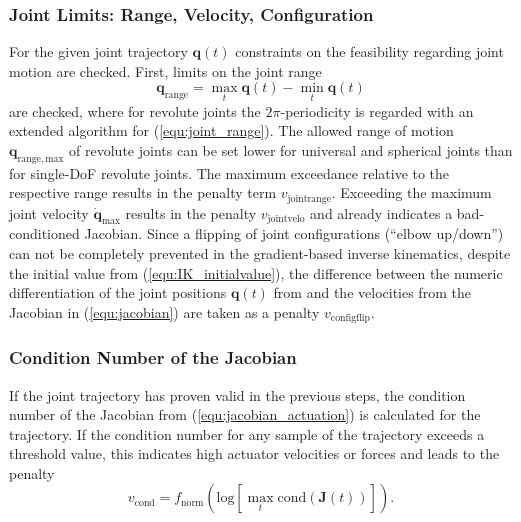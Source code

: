 \documentclass[fleqn,a4paper,10pt]{article}
\newcommand{\bm}[1]{\mathbf{#1}}
\begin{document}
\begin{multicols}{2}
\subsubsection{Joint Limits: Range, Velocity, Configuration}

For the given joint trajectory $\bm{q}(t)$ constraints on the feasibility regarding joint motion are checked.
First, limits on the joint range %
%
\begin{equation}
\bm{q}_\mathrm{range} = \max\limits_{t} \bm{q}(t) - \min\limits_{t} \bm{q}(t)
\label{equ:joint_range}
\end{equation}
%
are checked, where for revolute joints the $2\pi$-periodicity is regarded with an extended algorithm for (\ref{equ:joint_range}).
The allowed range of motion $\bm{q}_\mathrm{range,max}$ of revolute joints can be set lower for universal and spherical joints than for single-DoF revolute joints.
The maximum exceedance relative to the respective range results in the penalty term $v_\mathrm{jointrange}$.
%
Exceeding the maximum joint velocity $\dot{\bm{q}}_\mathrm{max}$ results in the penalty $v_\mathrm{jointvelo}$ and already indicates a bad-conditioned Jacobian.
%
Since a flipping of joint configurations (``elbow up/down'') can not be completely prevented in the gradient-based inverse kinematics, despite the initial value from (\ref{equ:IK_initialvalue}), the difference between the numeric differentiation of the joint positions $\bm{q}(t)$ from  and the velocities from the Jacobian in (\ref{equ:jacobian}) are taken as a penalty $v_\mathrm{configflip}$.


\subsubsection{Condition Number of the Jacobian}

If the joint trajectory has proven valid in the previous steps, the condition number of the Jacobian from (\ref{equ:jacobian_actuation}) is calculated for the trajectory.
If the condition number for any sample of the trajectory exceeds a threshold value, this indicates high actuator velocities or forces and leads to the penalty
%
\begin{equation}
v_{\mathrm{cond}} = f_\mathrm{norm}(\mathrm{log}[\max\limits_{t}  \mathrm{cond}(\bm{J}(t))]). %
\end{equation}
%


\end{multicols}
\end{document}
